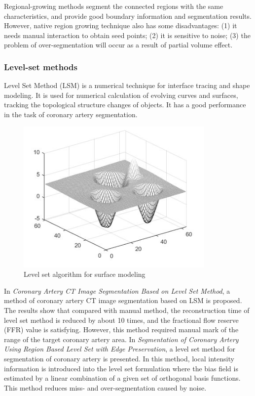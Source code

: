\documentclass[lang=cn,11pt,a4paper,cite=numbers]{elegantpaper}
\begin{document}
Regional-growing methods segment the connected regions with the same characteristics, and provide good boundary information and segmentation results.  However, native region growing technique also has some disadvantages: (1) it needs manual interaction to obtain seed points; (2) it is sensitive to noise; (3) the problem of over-segmentation will occur as a result of partial volume effect.

\subsubsection{Level-set methods}

Level Set Method (LSM) is a numerical technique for interface tracing and shape modeling. It is used for numerical calculation of evolving curves and surfaces, tracking the topological structure changes of objects. It has a good performance in the task of coronary artery segmentation.

\begin{figure}[H]
    \centering
    \includegraphics[scale=1]{./image/文献综述/水平集.png}
    \caption{Level set algorithm for surface modeling}
    \label{fig:LevelSet}
\end{figure}

In \emph{Coronary Artery CT Image Segmentation Based on Level Set Method}\cite{4}, a method of coronary artery CT image segmentation based on LSM is proposed. The results show that compared with manual method, the reconstruction time of level set method is reduced by about 10 times, and the fractional flow reserve (FFR) value is satisfying. However, this method required manual mark of the range of the target coronary artery area. In \emph{Segmentation of Coronary Artery Using Region Based Level Set with Edge Preservation}\cite{5}, a level set method for segmentation of coronary artery is presented. In this method, local intensity information is introduced into the level set formulation where the bias field is estimated by a linear combination of a given set of orthogonal basis functions. This method reduces miss- and over-segmentation caused by noise.
\end{document}
